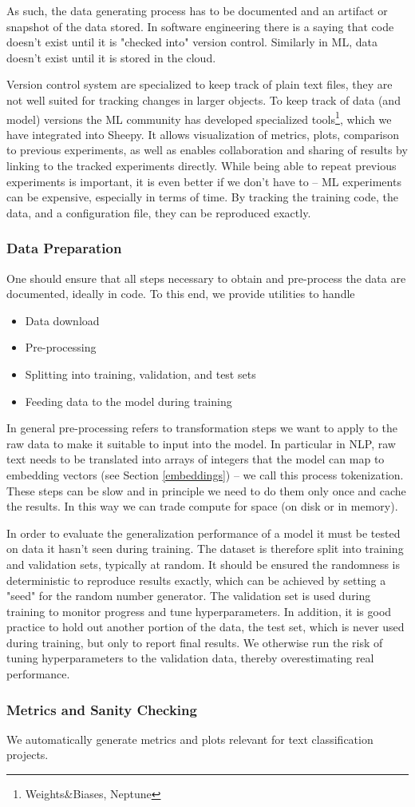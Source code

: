 As such, the data generating process has to be documented and an artifact or snapshot of the data stored.
In software engineering there is a saying that code doesn't exist until it is "checked into" version control.
Similarly in ML, data doesn't exist until it is stored in the cloud.

Version control system are specialized to keep track of plain text files, they are not well suited for tracking changes in larger objects.
To keep track of data (and model) versions the ML community has developed specialized tools\footnote{Weights\&Biases, Neptune}, which we have integrated into Sheepy.
It allows visualization of metrics, plots, comparison to previous experiments, as well as enables collaboration and sharing of results by linking to the tracked experiments directly.
While being able to repeat previous experiments is important, it is even better if we don't have to -- ML experiments can be expensive, especially in terms of time.
By tracking the training code, the data, and a configuration file, they can be reproduced exactly.

\subsubsection{Data Preparation}
One should ensure that all steps necessary to obtain and pre-process the data are documented, ideally in code.
To this end, we provide utilities to handle
\begin{itemize}
    \item Data download
    \item Pre-processing
    \item Splitting into training, validation, and test sets
    \item Feeding data to the model during training
\end{itemize}

In general pre-processing refers to transformation steps we want to apply to the raw data to make it suitable to input into the model.
In particular in NLP, raw text needs to be translated into arrays of integers that the model can map to embedding vectors (see Section \ref{embeddings}) -- we call this process tokenization.
These steps can be slow and in principle we need to do them only once and cache the results.
In this way we can trade compute for space (on disk or in memory).

In order to evaluate the generalization performance of a model it must be tested on data it hasn't seen during training.
The dataset is therefore split into training and validation sets, typically at random.
It should be ensured the randomness is deterministic to reproduce results exactly, which can be achieved by setting a "seed" for the random number generator.
The validation set is used during training to monitor progress and tune hyperparameters.
In addition, it is good practice to hold out another portion of the data, the test set, which is never used during training, but only to report final results.
We otherwise run the risk of tuning hyperparameters to the validation data, thereby overestimating real performance.

\subsubsection{Metrics and Sanity Checking}
\label{metrics_and_sanity_checking}
We automatically generate metrics and plots relevant for text classification projects.


